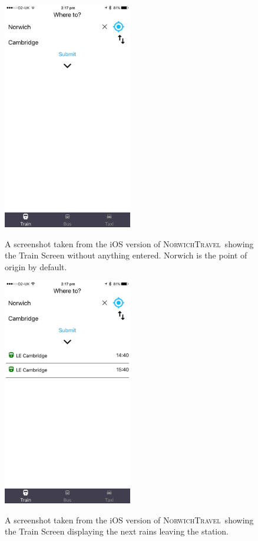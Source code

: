 \documentclass[cmpstyle]{ueacmpstyle}
\newcommand{\nt}{\textsc{NorwichTravel}}
\begin{document}
		\begin{figure}[h]
			\centering
			\includegraphics[height=10cm]{images/ios-train-1.jpg}\\
			\caption{A screenshot taken from the iOS version of \nt \ showing the Train Screen without anything entered. Norwich is the point of origin by default.}\label{fig:ios-train-1}
		\end{figure}
		\begin{figure}[h]
			\centering
			\includegraphics[height=10cm]{images/ios-train-2.jpg}\\
			\caption{A screenshot taken from the iOS version of \nt \ showing the Train Screen displaying the next rains leaving the station.}\label{fig:ios-train-2}
		\end{figure}
\end{document}
